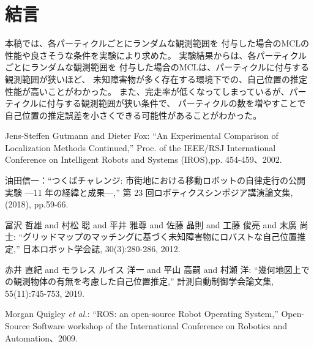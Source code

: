 \documentclass{jarticle}
\begin{document}


\section{結言}%

本稿では、各パーティクルごとにランダムな観測範囲を
付与した場合のMCLの性能や良さそうな条件を実験により求めた。
実験結果からは、各パーティクルごとにランダムな観測範囲を
付与した場合のMCLは、パーティクルに付与する観測範囲が狭いほど、
未知障害物が多く存在する環境下での、自己位置の推定性能が高いことがわかった。
また、完走率が低くなってしまっているが、パーティクルに付与する観測範囲が狭い条件で、
パーティクルの数を増やすことで自己位置の推定誤差を小さくできる可能性があることがわかった。


\footnotesize
\begin{thebibliography}{99}

  Jens-Steffen Gutmann and Dieter Fox: 
  ``An Experimental Comparison of Localization Methods Continued,''
  Proc. of the IEEE/RSJ International Conference on Intelligent Robots and Systems (IROS),pp. 454-459、2002.

  油田信一：“つくばチャレンジ: 市街地における移動ロボットの自律走行の公開実験 —11 年の経緯と成果—,''
  第 23 回ロボティクスシンポジア講演論文集, (2018), pp.59-66.
  
  冨沢 哲雄 and 村松 聡 and 平井 雅尊 and 佐藤 晶則 and 工藤 俊亮 and 末廣 尚士:
  ``グリッドマップのマッチングに基づく未知障害物にロバストな自己位置推定,'' 日本ロボット学会誌, 30(3):280-286, 2012.
  
  赤井 直紀 and モラレス ルイス 洋一 and 平山 高嗣 and 村瀬 洋:
  ``幾何地図上での観測物体の有無を考慮した自己位置推定,'' 計測自動制御学会論文集, 55(11):745-753, 2019.
  
	Morgan Quigley {\it et al.}: ``ROS: an open-source Robot Operating System,'' 
  Open-Source Software workshop of the International Conference on Robotics and Automation、2009. 

\end{thebibliography}

\normalsize
\end{document}

